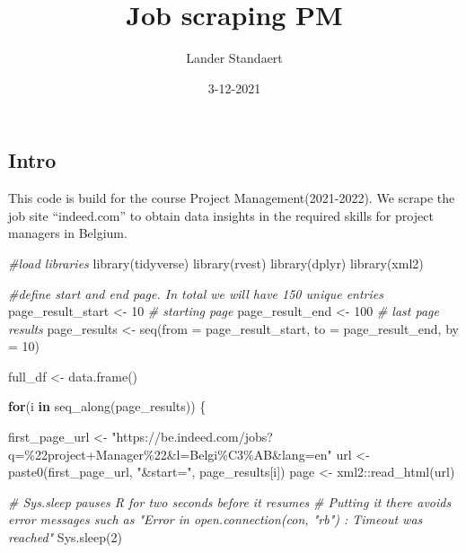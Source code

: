 \documentclass[
]{article}
\title{Job scraping PM}
\author{Lander Standaert}
\date{3-12-2021}
\newenvironment{Shaded}{\begin{snugshade}}{\end{snugshade}}
\newcommand{\AttributeTok}[1]{\textcolor[rgb]{0.77,0.63,0.00}{#1}}
\newcommand{\CommentTok}[1]{\textcolor[rgb]{0.56,0.35,0.01}{\textit{#1}}}
\newcommand{\ControlFlowTok}[1]{\textcolor[rgb]{0.13,0.29,0.53}{\textbf{#1}}}
\newcommand{\DecValTok}[1]{\textcolor[rgb]{0.00,0.00,0.81}{#1}}
\newcommand{\FunctionTok}[1]{\textcolor[rgb]{0.00,0.00,0.00}{#1}}
\newcommand{\NormalTok}[1]{#1}
\newcommand{\OtherTok}[1]{\textcolor[rgb]{0.56,0.35,0.01}{#1}}
\newcommand{\SpecialCharTok}[1]{\textcolor[rgb]{0.00,0.00,0.00}{#1}}
\newcommand{\StringTok}[1]{\textcolor[rgb]{0.31,0.60,0.02}{#1}}
\begin{document}
\maketitle

\hypertarget{intro}{%
\subsection{Intro}\label{intro}}

This code is build for the course Project Management(2021-2022). We
scrape the job site ``indeed.com'' to obtain data insights in the
required skills for project managers in Belgium.

\begin{Shaded}
\begin{Highlighting}[]
\CommentTok{\#load libraries}
\FunctionTok{library}\NormalTok{(tidyverse)}
\FunctionTok{library}\NormalTok{(rvest)}
\FunctionTok{library}\NormalTok{(dplyr)}
\FunctionTok{library}\NormalTok{(xml2)}

\CommentTok{\#define start and end page. In total we will have 150 unique entries}
\NormalTok{page\_result\_start }\OtherTok{\textless{}{-}} \DecValTok{10} \CommentTok{\# starting page }
\NormalTok{page\_result\_end }\OtherTok{\textless{}{-}} \DecValTok{100} \CommentTok{\# last page results}
\NormalTok{page\_results }\OtherTok{\textless{}{-}} \FunctionTok{seq}\NormalTok{(}\AttributeTok{from =}\NormalTok{ page\_result\_start, }\AttributeTok{to =}\NormalTok{ page\_result\_end, }\AttributeTok{by =} \DecValTok{10}\NormalTok{)}

\NormalTok{full\_df }\OtherTok{\textless{}{-}} \FunctionTok{data.frame}\NormalTok{()}

\ControlFlowTok{for}\NormalTok{(i }\ControlFlowTok{in} \FunctionTok{seq\_along}\NormalTok{(page\_results)) \{}
  
\NormalTok{  first\_page\_url }\OtherTok{\textless{}{-}} \StringTok{"https://be.indeed.com/jobs?q=\%22project+Manager\%22\&l=Belgi\%C3\%AB\&lang=en"}
\NormalTok{  url }\OtherTok{\textless{}{-}} \FunctionTok{paste0}\NormalTok{(first\_page\_url, }\StringTok{"\&start="}\NormalTok{, page\_results[i])}
\NormalTok{  page }\OtherTok{\textless{}{-}}\NormalTok{ xml2}\SpecialCharTok{::}\FunctionTok{read\_html}\NormalTok{(url)}
  
  \CommentTok{\# Sys.sleep pauses R for two seconds before it resumes}
  \CommentTok{\# Putting it there avoids error messages such as "Error in open.connection(con, "rb") : Timeout was reached"}
  \FunctionTok{Sys.sleep}\NormalTok{(}\DecValTok{2}\NormalTok{)}
 

\end{Highlighting}
\end{Shaded}
\end{document}
